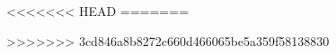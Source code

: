 \documentclass[utf8x, 14pt]{G7-32} %
\begin{document}
\frontmatter %






\tableofcontents


<<<<<<< HEAD
=======

>>>>>>> 3cd846a8b8272c660d466065be5a359f58138830


\mainmatter %





%

%

\backmatter %

%



\appendix   %
	
\end{document}
